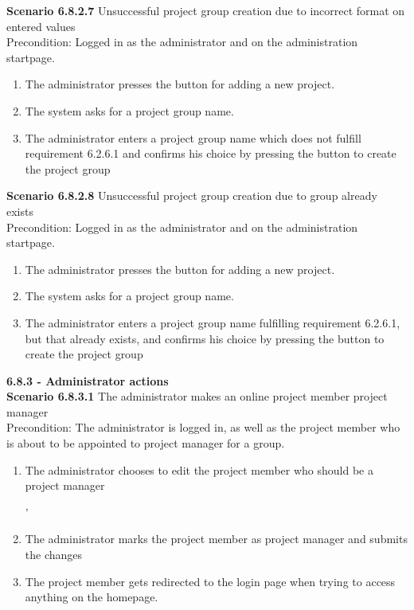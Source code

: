 \documentclass{article}
\begin{document}
\noindent\textbf{Scenario 6.8.2.7} Unsuccessful project group creation due to incorrect format on entered values\\
Precondition: Logged in as the administrator and on the administration startpage.
\begin{enumerate}
\item The administrator presses the button for adding a new project.
\item The system asks for a project group name.
\item The administrator enters a project group name which does not fulfill requirement 6.2.6.1 and confirms his choice by pressing the button to create the project group
\end{enumerate}

\noindent\textbf{Scenario 6.8.2.8}  Unsuccessful project group creation due to group already exists \\
Precondition: Logged in as the administrator and on the administration startpage.
\begin{enumerate}
\item The administrator presses the button for adding a new project.
\item The system asks for a project group name.
\item The administrator enters a project group name fulfilling requirement 6.2.6.1, but that already exists, and confirms his choice by pressing the button to create the project group
\end{enumerate}

\noindent
{\fontsize{11}{11}\selectfont \noindent\textbf{6.8.3 - Administrator actions}} \\
\noindent\textbf{Scenario 6.8.3.1} The administrator makes an online project member project manager \\
Precondition: The administrator is logged in, as well as the project member who is about to be appointed to project manager for a group.
\begin{enumerate}
\item The administrator chooses to edit the project member who should be a project manager

'\item The administrator marks the project member as project manager and submits the changes
\item The project member gets redirected to the login page when trying to access anything on the homepage.
\end{enumerate}
\end{document}
